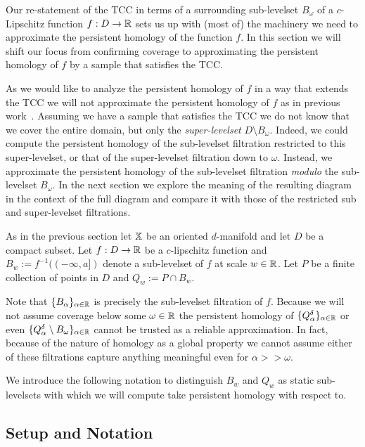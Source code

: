 
Our re-statement of the TCC in terms of a surrounding sub-levelset $B_\omega$ of a $c$-Lipschitz function $f : D\to \mathbb{R}$ sets us up with (most of) the machinery we need to approximate the persistent homology of the function $f$.
In this section we will shift our focus from confirming coverage to approximating the persistent homology of $f$ by a sample that satisfies the TCC.

As we would like to analyze the persistent homology of $f$ in a way that extends the TCC we will not approximate the persistent homology of $f$ as in previous work~\cite{chazal09analysis}.
Assuming we have a sample that satisfies the TCC we do not know that we cover the entire domain, but only the \emph{super-levelset} $D\setminus B_\omega$.
Indeed, we could compute the persistent homology of the sub-levelset filtration restricted to this super-levelset, or that of the super-levelset filtration down to $\omega$.
Instead, we approximate the persistent homology of the sub-levelset filtration \emph{modulo} the sub-levelset $B_\omega$.
In the next section we explore the meaning of the resulting diagram in the context of the full diagram and compare it with those of the restricted sub and super-levelset filtrations.

As in the previous section let $\mathbb{X}$ be an oriented $d$-manifold and let $D$ be a compact subset.
Let $f: D\to\mathbb{R}$ be a $c$-lipschitz function and $B_w := f^{-1}((-\infty,a])$ denote a sub-levelset of $f$ at scale $w\in\mathbb{R}$.
Let $P$ be a finite collection of points in $D$ and $Q_w := P\cap B_w$.

Note that $\{B_\alpha\}_{\alpha\in\mathbb{R}}$ is precisely the sub-levelset filtration of $f$.
Because we will not assume coverage below some $\omega\in\mathbb{R}$ the persistent homology of $\{Q_\alpha^\delta\}_{\alpha\in\mathbb{R}}$ or even $\{Q_\alpha^\delta\setminus B_\omega\}_{\alpha\in\mathbb{R}}$ cannot be trusted as a reliable approximation.
In fact, because of the nature of homology as a global property we cannot assume either of these filtrations capture anything meaningful even for $\alpha >> \omega$.

We introduce the following notation to distinguish $B_w$ and $Q_w$ as static sub-levelsets with which we will compute take persistent homology with respect to.

\subsection{Setup and Notation}

